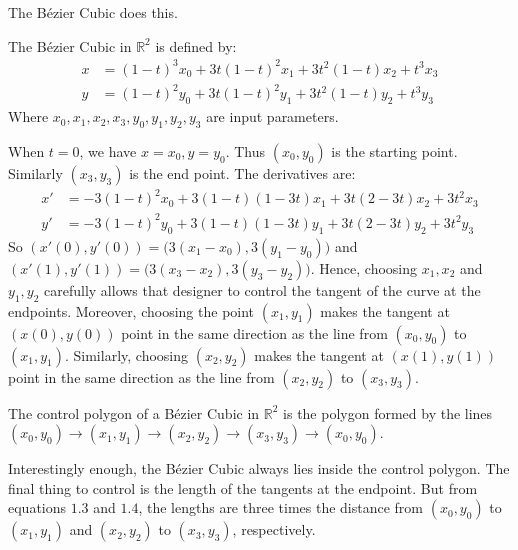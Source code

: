 \documentclass[crop=false,class=article,oneside]{standalone}
\begin{document}
    The B\'{e}zier Cubic does this.
    \begin{definition}
    The B\'{e}zier Cubic in $\mathbb{R}^2$ is defined by:
    \begin{align*}
        x &= (1-t)^3 x_0+3t(1-t)^2x_1+3t^2(1-t)x_2+t^3x_3 \\
        y &= (1-t)^2 y_0+3t(1-t)^2y_1+3t^2(1-t)y_2+t^3y_3
    \end{align*}
    Where $x_0,x_1,x_2,x_3,y_0,y_1,y_2,y_3$ are input parameters.
    \end{definition}
    When $t=0$, we have $x = x_0, y=y_0$. Thus $(x_0,y_0)$ is the starting point. Similarly $(x_3,y_3)$ is the end point. The derivatives are:
    \begin{align*}
        x' &= -3(1-t)^2x_0 + 3(1-t)(1-3t)x_1+3t(2-3t)x_2+3t^2x_3 \\
        y' &= -3(1-t)^2y_0 + 3(1-t)(1-3t)y_1+3t(2-3t)y_2+3t^2y_3
    \end{align*}
    So $(x'(0),y'(0)) = \big(3(x_1-x_0),3(y_1-y_0)\big)$ and $(x'(1),y'(1)) = \big(3(x_3-x_2),3(y_3-y_2)\big)$. Hence, choosing $x_1,x_2$ and $y_1,y_2$ carefully allows that designer to control the tangent of the curve at the endpoints. Moreover, choosing the point $(x_1,y_1)$ makes the tangent at $(x(0),y(0))$ point in the same direction as the line from $(x_0,y_0)$ to $(x_1,y_1)$. Similarly, choosing $(x_2,y_2)$ makes the tangent at $(x(1),y(1))$ point in the same direction as the line from $(x_2,y_2)$ to $(x_3,y_3)$.
    \begin{definition}
    The control polygon of a B\'{e}zier Cubic in $\mathbb{R}^2$ is the polygon formed by the lines $(x_0,y_0)\rightarrow(x_1,y_1)\rightarrow(x_2,y_2)\rightarrow(x_3,y_3)\rightarrow (x_0,y_0)$.
    \end{definition}
    Interestingly enough, the B\'{e}zier Cubic always lies inside the control polygon. The final thing to control is the length of the tangents at the endpoint. But from equations $1.3$ and $1.4$, the lengths are three times the distance from $(x_0,y_0)$ to $(x_1,y_1)$ and $(x_2,y_2)$ to $(x_3,y_3)$, respectively. 
\end{document}
